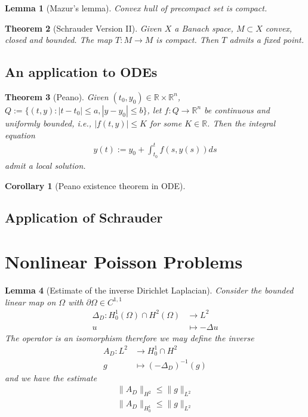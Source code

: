 \documentclass[a4paper,11pt,oneside,fleqn]{book}
\newtheorem{theorem}{Theorem}[section]
\newtheorem{corollary}{Corollary}[theorem]
\newtheorem{lemma}[theorem]{Lemma}
\theoremstyle{definition}
\theoremstyle{remark}
\begin{document}
\begin{lemma}[Mazur's lemma]
	Convex hull of precompact set is compact. 
\end{lemma}

\begin{theorem}[Schrauder Version II]
	Given $X$ a Banach space, $M \subset X$ convex, closed and bounded. The map $T: M \rightarrow M$ is compact. Then $T$ admits a fixed point. 
\end{theorem}

\subsection{An application to ODEs}
\begin{theorem}[Peano]
Given $(t_0, y_0) \in \mathbb{R} \times \mathbb{R}^n$, $Q:= \{(t, y): |t - t_0| \le a, |y - y_0| \le b\}$, let $f: Q \rightarrow \mathbb{R}^n$ be continuous and uniformly bounded, i.e., $|f(t, y)| \le K$ for some $K \in \mathbb{R}$. Then the integral equation
\begin{align*}
	y(t):= y_0 + \int_{t_0}^t f(s, y(s)) ds 
\end{align*}
admit a local solution.	
\end{theorem}

\begin{corollary}[Peano existence theorem in ODE]
	
\end{corollary}


\subsection{Application of Schrauder}



\section{Nonlinear Poisson Problems}
\begin{lemma}[Estimate of the inverse Dirichlet Laplacian]
Consider the bounded linear map on $\Omega$ with $\partial\Omega \in C^{1, 1}$
\begin{align*}
	\Delta_D: H^1_0(\Omega) \cap H^2(\Omega) &\rightarrow L^2\\
	u &\mapsto -\Delta u
\end{align*}
The operator is an isomorphism therefore we may define the inverse
\begin{align*}
	A_D: L^2 &\rightarrow H^1_0 \cap H^2\\
	g &\mapsto (-\Delta_D)^{-1}(g)
\end{align*}
and we have the estimate
\begin{align*}
	\|A_D\|_{H^2} \le \|g\|_{L^2}\\
	\|A_D\|_{H^1_0} \le \|g\|_{L^2}
\end{align*}
\end{lemma}
\end{document}
